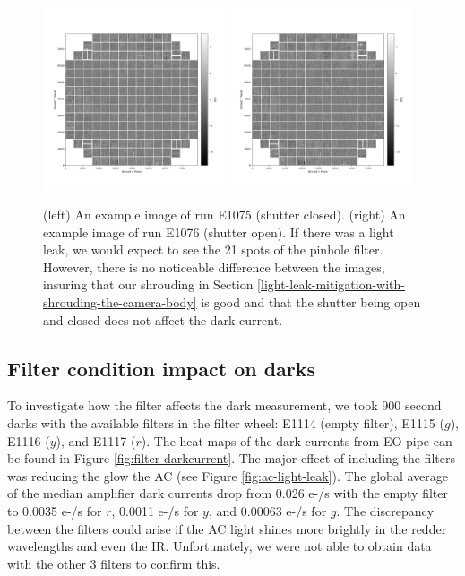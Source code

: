 \begin{figure}[ht]
\begin{centering}
\includegraphics[width=0.48\textwidth]{figures/E1075_ShutterClosed.png}
\includegraphics[width=0.48\textwidth]{figures/E1076_ShutterOpen.png}
\caption{ (left) An example image of run E1075 (shutter closed). (right) An example image of run E1076 (shutter open). If there was a light leak, we would expect to see the 21 spots of the pinhole filter. However, there is no noticeable difference between the images, insuring that our shrouding in Section \ref{light-leak-mitigation-with-shrouding-the-camera-body} is good and that the shutter being open and closed does not affect the dark current. \label{fig:shutter-darkcurrent}}
\end{centering}
\end{figure}


\subsection{Filter condition impact on
darks}\label{filter-condition-impact-on-darks}

To investigate how the filter affects the dark measurement, we took 900 second darks with the available filters in the filter wheel: E1114 (empty filter), E1115 ($g$), E1116 ($y$), and E1117 ($r$). The heat maps of the dark currents from EO pipe can be found in Figure \ref{fig:filter-darkcurrent}. The major effect of including the filters was reducing the glow the AC (see Figure \ref{fig:ac-light-leak}). The global average of the median amplifier dark currents drop from 0.026 e-/s with the empty filter to 0.0035 e-/s for $r$, 0.0011 e-/s for $y$, and 0.00063 e-/s for $g$. The discrepancy between the filters could arise if the AC light shines more brightly in the redder wavelengths and even the IR. Unfortunately, we were not able to obtain data with the other 3 filters to confirm this.

